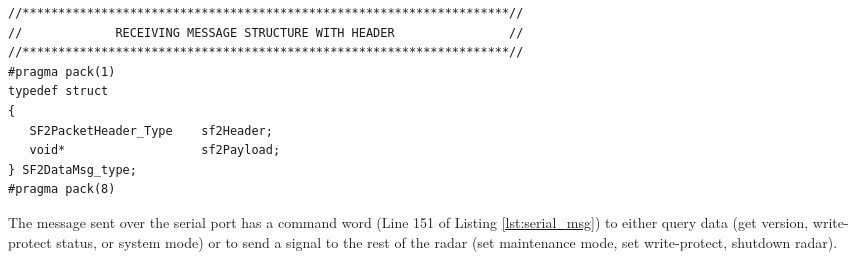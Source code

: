 \documentclass[12pt]{article}
\begin{document}
{\begin{adjustwidth}{0.0in}{0.0in}
\begin{lstlisting}[firstnumber=143, caption={\texttt{exeCswBoot/SerialCommonTypes.h} Serial Port message (variable length)}, label={lst:serial_msg}]
//********************************************************************//
//             RECEIVING MESSAGE STRUCTURE WITH HEADER                //
//********************************************************************//
#pragma pack(1)
typedef struct
{
   SF2PacketHeader_Type    sf2Header;
   void*                   sf2Payload;
} SF2DataMsg_type;
#pragma pack(8)

\end{lstlisting}
\end{adjustwidth}


The message sent over the serial port has a command word (Line 151 of Listing \ref{lst:serial_msg}) to either query data (get version,
write-protect status, or system mode) or to send a signal to the rest of the radar (set maintenance mode, set write-protect, shutdown radar).

}
\end{document}
